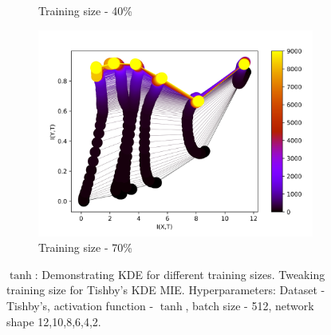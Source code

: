 \documentclass[dissertation.tex]{subfiles}
\begin{document}
\begin{figure}[ht]
\begin{subfigure}[t]{0.32\textwidth}
    \caption{
      Training size - 40\%
    }
    \label{figKDETS40}
  \end{subfigure}
  \begin{subfigure}[t]{0.32\textwidth}
    \centering
    \includegraphics[width=\textwidth]{figs/eval/trainingSize/KDE70.png}
    \caption{
      Training size - 70\%
    }
    \label{figKDETS70}
  \end{subfigure}
  \caption{
      $\tanh$: Demonstrating KDE for different training sizes.  Tweaking training
      size for Tishby's KDE MIE. Hyperparameters: Dataset - Tishby's, activation
      function - $\tanh$, batch size - 512, network shape 12,10,8,6,4,2.
    }
  \label{figKDETS}
\end{figure}
\end{document}

